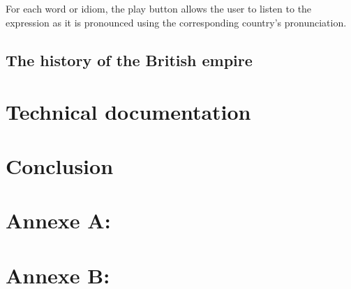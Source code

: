 \documentclass[11pt, a4paper]{report}
\begin{document}
\paragraph{}For each word or idiom, the play button allows the user to listen to the expression as it is pronounced using the corresponding country's pronunciation.


\section*{The history of the British empire}



\chapter*{Technical documentation}


\chapter*{Conclusion}



\newpage

\appendix
\chapter*{Annexe A: }

\newpage

\chapter*{Annexe B: }
\end{document}
